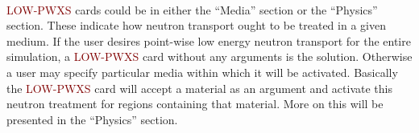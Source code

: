 \paragraph{}
\textcolor{Maroon}{LOW-PWXS} cards could be in either the ``Media'' section or the ``Physics'' section. These indicate how neutron transport ought to be treated in a given medium. If the user desires point-wise low energy neutron transport for the entire simulation, a \textcolor{Maroon}{LOW-PWXS} card without any arguments is the solution. Otherwise a user may specify particular media within which it will be activated. Basically the \textcolor{Maroon}{LOW-PWXS} card will accept a material as an argument and activate this neutron treatment for regions containing that material. More on this will be presented in the ``Physics'' section.
